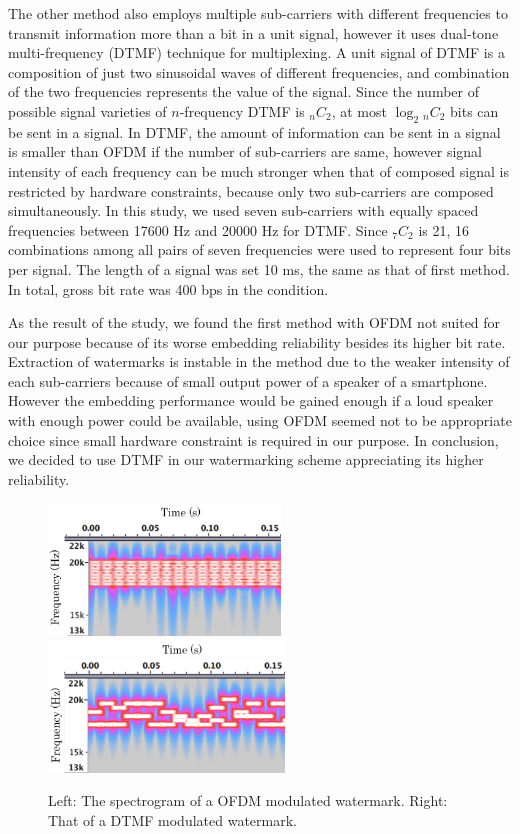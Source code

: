 The other method also employs multiple sub-carriers with different frequencies to transmit information more than a bit in a unit signal, however it uses dual-tone multi-frequency (DTMF) technique for multiplexing.
A unit signal of DTMF is a composition of just two sinusoidal waves of different frequencies, and combination of the two frequencies represents the value of the signal.
Since the number of possible signal varieties of $n$-frequency DTMF is $_n C _2$, at most $\log_2 {}_n C _2$ bits can be sent in a signal.
In DTMF, the amount of information can be sent in a signal is smaller than OFDM if the number of sub-carriers are same, however signal intensity of each frequency can be much stronger when that of composed signal is restricted by hardware constraints, because only two sub-carriers are composed simultaneously.
In this study, we used seven sub-carriers with equally spaced frequencies between 17600 Hz and 20000 Hz for DTMF. Since $_7 C _2$ is 21, 16 combinations among all pairs of seven frequencies were used to represent four bits per signal.
The length of a signal was set 10 ms, the same as that of first method.
In total, gross bit rate was 400 bps in the condition.

As the result of the study, we found the first method with OFDM not suited for our purpose because of its worse embedding reliability besides its higher bit rate.
Extraction of watermarks is instable in the method due to the weaker intensity of each sub-carriers because of small output power of a speaker of a smartphone.
However the embedding performance would be gained enough if a loud speaker with enough power could be available, using OFDM seemed not to be appropriate choice since small hardware constraint is required in our purpose.
In conclusion, we decided to use DTMF in our watermarking scheme appreciating its higher reliability.

\begin{figure}[htbp]
 \begin{center}
  \includegraphics[height=35mm]{watermarking_ofdm.png}
  \hspace{5mm}
  \includegraphics[height=35mm]{watermarking_dtmf.png}
 \end{center}
 \caption{Left: The spectrogram of a OFDM modulated watermark. Right: That of a DTMF modulated watermark.}
 \label{fig:watr_spec}
\end{figure}

